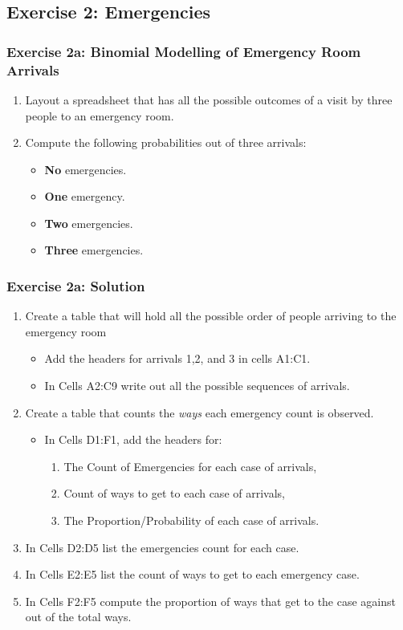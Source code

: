 \documentclass[12pt]{beamer}
\begin{document}
\subsection{Exercise 2: Emergencies}
	\begin{frame}
		\frametitle{Exercise 2a: Binomial Modelling of Emergency Room Arrivals}
		\begin{enumerate}
			\item Layout a spreadsheet that has all the possible outcomes of a visit by three people to an emergency room.
			\item Compute the following probabilities out of three arrivals:
			\begin{itemize}
				\item \textbf{No} emergencies.
				\item \textbf{One} emergency.
				\item \textbf{Two} emergencies.
				\item \textbf{Three} emergencies.
			\end{itemize}
		\end{enumerate}
	\end{frame}
	\begin{frame}
		\frametitle{Exercise 2a: Solution}
		\begin{enumerate}
			\item Create a table that will hold all the possible order of people arriving to the emergency room
			\begin{itemize}
				\item Add the headers for arrivals 1,2, and 3 in cells A1:C1.
				\item In Cells A2:C9 write out all the possible sequences of arrivals.
			\end{itemize}
			\item Create a table that counts the \textit{ways} each emergency count is observed.
			\begin{itemize}
				\item In Cells D1:F1, add the headers for:
					\begin{enumerate}
						\item The Count of Emergencies for each case of arrivals,
						\item Count of ways to get to each case of arrivals,
						\item The Proportion/Probability of each case of arrivals.
					\end{enumerate}
			\end{itemize}
			\item In Cells D2:D5 list the emergencies count for each case.
			\item In Cells E2:E5 list the count of ways to get to each emergency case.
			\item In Cells F2:F5 compute the proportion of ways that get to the case against out of the total ways.
		\end{enumerate}
	\end{frame}
\end{document}
